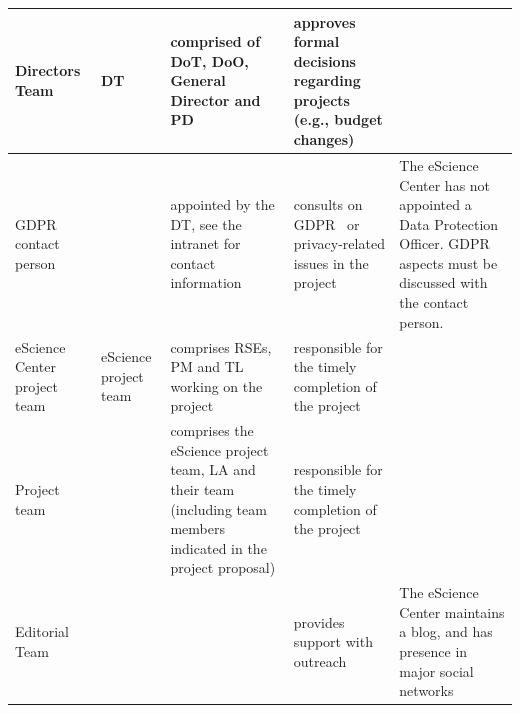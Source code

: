 \begin{tabularx}{\linewidth}{p{}|p{}|p{}|p{}|p{}}
Directors Team                                     & DT                    & comprised of DoT, DoO, General Director and PD                                                                    & approves formal decisions regarding projects (e.g., budget changes)                                                                                                                                                                    &                                                                                                                                      \\\hline
GDPR contact person                                &                       & appointed by the DT, see the intranet for contact information                                                     & consults on GDPR~\cite{GDPR} or privacy-related issues in the project                                                                                                                                                                             & The eScience Center has not appointed a Data Protection Officer. GDPR aspects must be discussed with the contact person.             \\\hline
eScience Center project team                       & eScience project team & comprises RSEs, PM and TL working on the project                                                                  & responsible for the timely completion of the project                                                                                                                                                                                   &                                                                                                                                      \\\hline
Project team                                       &                       & comprises the eScience project team, LA and their team (including team members indicated in the project proposal) & responsible for the timely completion of the project                                                                                                                                                                                   &                                                                                                                                      \\\hline
Editorial Team                                     &                       &                                                                                                                   & provides support with outreach                                                                                                                                                                                                         & The eScience Center maintains a blog, and has presence in major social networks                                                     
\end{tabularx}


